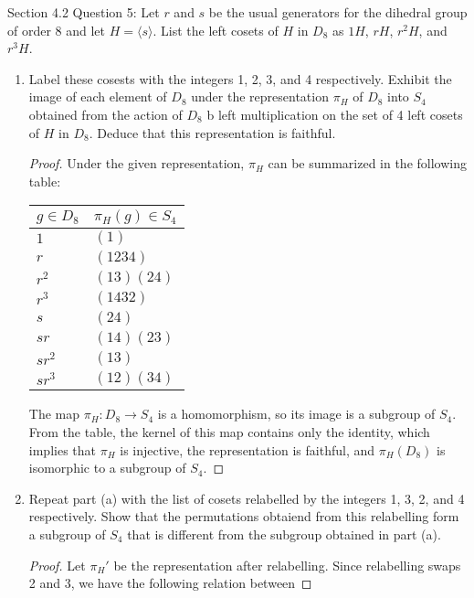Section 4.2 Question 5: Let $r$ and $s$ be the usual generators for the
dihedral group of order 8 and let $H=\langle s\rangle$. List the left
cosets of $H$ in $D_8$ as $1H$, $rH$, $r^2H$, and $r^3H$.

\begin{enumerate}
  \item Label these cosests with the integers 1, 2, 3, and 4 respectively.
    Exhibit the image of each element of $D_8$ under the representation
    $\pi_H$ of $D_8$ into $S_4$ obtained from the action of $D_8$ b left
    multiplication on the set of 4 left cosets of $H$ in $D_8$. Deduce that
    this representation is faithful.
    \begin{proof}
      Under the given representation, $\pi_H$ can be summarized in the
      following table:
      \begin{center}
        \begin{tabular}{|l|l|}
          \hline
          $g\in D_8$ & $\pi_H(g)\in S_4$ \\
          \hline\hline
          $1$     & $(1)$ \\
          $r$     & $(1234)$ \\
          $r^2$   & $(13)(24)$ \\
          $r^3$   & $(1432)$ \\
          $s$     & $(24)$ \\
          $sr$    & $(14)(23)$ \\
          $sr^2$  & $(13)$ \\
          $sr^3$  & $(12)(34)$ \\
          \hline
        \end{tabular}
      \end{center}
      The map $\pi_H:D_8\rightarrow S_4$ is a homomorphism, so its
      image is a subgroup of $S_4$. From the table, the kernel of this
      map contains only the identity, which implies that $\pi_H$ is
      injective, the representation is faithful, and $\pi_H(D_8)$ is
      isomorphic to a subgroup of $S_4$.
    \end{proof}
  \item Repeat part (a) with the list of cosets relabelled by the integers
    1, 3, 2, and 4 respectively. Show that the permutations obtaiend from
    this relabelling form a subgroup of $S_4$ that is different from the
    subgroup obtained in part (a).
    \begin{proof}
      Let $\pi_H'$ be the representation after relabelling. Since
      relabelling swaps 2 and 3, we have the following relation between

\end{proof}
\end{enumerate}
